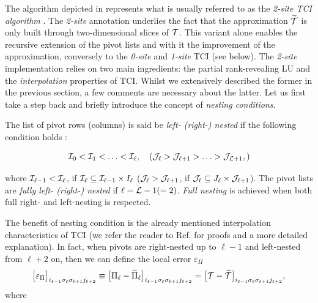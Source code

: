 The algorithm depicted in  represents what is usually referred to as the \textit{2-site TCI algorithm} \cite{Fernandez2024}. The \textit{2-site} annotation underlies the fact that the approximation $\widetilde{\mathcal{T}}$ is only built through two-dimensional slices of $\mathcal{T}$. This variant alone enables the recursive extension of the pivot lists and with it the improvement of the approximation, conversely to the \textit{0-site} and \textit{1-site} TCI (see below). The \textit{2-site} implementation relies on two main ingredients: the partial rank-revealing LU and the \textit{interpolation} properties of TCI. Whilst we extensively described the former in the previous section, a few comments are necessary about the latter. Let us first take a step back and briefly introduce the concept of \textit{nesting conditions}. 

The list of pivot rows (columns) is said be \textit{left- (right-) nested} if the following condition holds \cite{Oseledets2011, Dolgov2020}:

\begin{equation}
	\label{eq:Nesting}
	\mathcal{I}_0 <  \mathcal{I}_1  < \ldots < \mathcal{I}_{\ell} ,\quad (\mathcal{J}_{\ell} > \mathcal{J}_{\ell+1} > \ldots > \mathcal{J}_{\mathcal{L}+1} ,)
\end{equation}

where $\mathcal{I}_{\ell -1 } <\mathcal{I}_\ell$,  if
$\mathcal{I}_\ell \subseteq \mathcal{I}_{\ell -1 } \times 
I_\ell $ ($\mathcal{J}_{\ell} > \mathcal{J}_{\ell +1}$,  if
$\mathcal{J}_\ell \subseteq J_\ell \times \mathcal{J}_{\ell + 1 }$). The pivot lists are \textit{fully left- (right-) nested} if $\ell = \mathcal{L} - 1 (=2)$. \textit{Full nesting} is achieved when both full right- and left-nesting is respected.

The benefit of nesting condition is the already mentioned interpolation characteristics of TCI (we refer the reader to Ref. \cite{Fernandez2022, Fernandez2024} for proofs and a more detailed explanation). In fact, when pivots are right-nested up to $\ell -1$ and left-nested from $\ell +2$ on, then we can define the local error $\varepsilon_\Pi$ 
\begin{equation}
	\label{eq:ErrorPiIsErrorT}
	\bigl[\varepsilon_\Pi\bigr]_{i_{\ell-1}\sigma_\ell \sigma_{\ell +1} j_{\ell +2 }} \equiv \bigl[ \Pi_\ell - \widetilde{\Pi}_\ell\bigr]_{i_{\ell-1}\sigma_\ell \sigma_{\ell +1} j_{\ell +2 }} 
	= 
   \bigl[ \mathcal{T}-\widetilde{\mathcal{T}}\bigr]_{i_{\ell-1}\sigma_\ell \sigma_{\ell +1} j_{\ell+2}},
 \end{equation}
where 

